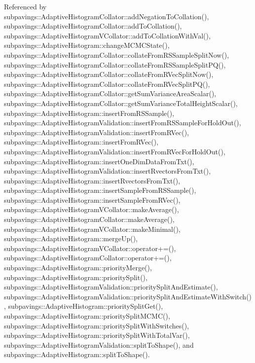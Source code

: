 \-Referenced by subpavings\-::\-Adaptive\-Histogram\-Collator\-::add\-Negation\-To\-Collation(), subpavings\-::\-Adaptive\-Histogram\-Collator\-::add\-To\-Collation(), subpavings\-::\-Adaptive\-Histogram\-V\-Collator\-::add\-To\-Collation\-With\-Val(), subpavings\-::\-Adaptive\-Histogram\-::change\-M\-C\-M\-C\-State(), subpavings\-::\-Adaptive\-Histogram\-Collator\-::collate\-From\-R\-S\-Sample\-Split\-Now(), subpavings\-::\-Adaptive\-Histogram\-Collator\-::collate\-From\-R\-S\-Sample\-Split\-P\-Q(), subpavings\-::\-Adaptive\-Histogram\-Collator\-::collate\-From\-R\-Vec\-Split\-Now(), subpavings\-::\-Adaptive\-Histogram\-Collator\-::collate\-From\-R\-Vec\-Split\-P\-Q(), subpavings\-::\-Adaptive\-Histogram\-Collator\-::get\-Sum\-Variance\-Area\-Scalar(), subpavings\-::\-Adaptive\-Histogram\-Collator\-::get\-Sum\-Variance\-Total\-Height\-Scalar(), subpavings\-::\-Adaptive\-Histogram\-::insert\-From\-R\-S\-Sample(), subpavings\-::\-Adaptive\-Histogram\-Validation\-::insert\-From\-R\-S\-Sample\-For\-Hold\-Out(), subpavings\-::\-Adaptive\-Histogram\-Validation\-::insert\-From\-R\-Vec(), subpavings\-::\-Adaptive\-Histogram\-::insert\-From\-R\-Vec(), subpavings\-::\-Adaptive\-Histogram\-Validation\-::insert\-From\-R\-Vec\-For\-Hold\-Out(), subpavings\-::\-Adaptive\-Histogram\-::insert\-One\-Dim\-Data\-From\-Txt(), subpavings\-::\-Adaptive\-Histogram\-Validation\-::insert\-Rvectors\-From\-Txt(), subpavings\-::\-Adaptive\-Histogram\-::insert\-Rvectors\-From\-Txt(), subpavings\-::\-Adaptive\-Histogram\-::insert\-Sample\-From\-R\-S\-Sample(), subpavings\-::\-Adaptive\-Histogram\-::insert\-Sample\-From\-R\-Vec(), subpavings\-::\-Adaptive\-Histogram\-V\-Collator\-::make\-Average(), subpavings\-::\-Adaptive\-Histogram\-Collator\-::make\-Average(), subpavings\-::\-Adaptive\-Histogram\-V\-Collator\-::make\-Minimal(), subpavings\-::\-Adaptive\-Histogram\-::merge\-Up(), subpavings\-::\-Adaptive\-Histogram\-V\-Collator\-::operator+=(), subpavings\-::\-Adaptive\-Histogram\-Collator\-::operator+=(), subpavings\-::\-Adaptive\-Histogram\-::priority\-Merge(), subpavings\-::\-Adaptive\-Histogram\-::priority\-Split(), subpavings\-::\-Adaptive\-Histogram\-Validation\-::priority\-Split\-And\-Estimate(), subpavings\-::\-Adaptive\-Histogram\-Validation\-::priority\-Split\-And\-Estimate\-With\-Switch(), subpavings\-::\-Adaptive\-Histogram\-::priority\-Split\-Get(), subpavings\-::\-Adaptive\-Histogram\-::priority\-Split\-M\-C\-M\-C(), subpavings\-::\-Adaptive\-Histogram\-::priority\-Split\-With\-Switches(), subpavings\-::\-Adaptive\-Histogram\-::priority\-Split\-With\-Total\-Var(), subpavings\-::\-Adaptive\-Histogram\-Validation\-::split\-To\-Shape(), and subpavings\-::\-Adaptive\-Histogram\-::split\-To\-Shape().


